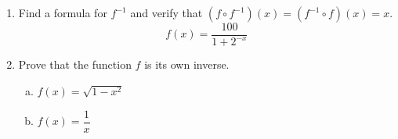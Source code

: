 \documentclass[11pt]{article}
\begin{document}
\begin{enumerate}
    \noindent Solve for $y$.


    \noindent Draw the graph and determine the domain and range.


    \newpage

    \item Find a formula for $\displaystyle f^{-1}$ and verify that $\displaystyle (f \circ f^{-1})(x) = (f^{-1} \circ f)(x) = x$.
    \[f(x) = \dfrac{100}{1 + 2^{-x}}\]

    \vspace{33ex}

    \item Prove that the function $f$ is its own inverse.

    \begin{enumerate}[(a)]
        \item $\displaystyle f(x) = \sqrt{1 - x^2}$\\[6ex]
        \item $\displaystyle f(x) = \dfrac{1}{x}$\\[6ex]
    \end{enumerate}

\end{enumerate}
\end{document}
